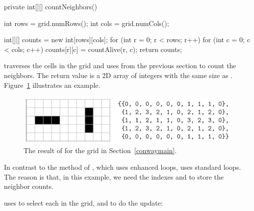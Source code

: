 \begin{code}
private int[][] countNeighbors() {
    int rows = grid.numRows();
    int cols = grid.numCols();

    int[][] counts = new int[rows][cols];
    for (int r = 0; r < rows; r++) {
        for (int c = 0; c < cols; c++) {
            counts[r][c] = countAlive(r, c);
        }
    }
    return counts;
}
\end{code}

 traverses the cells in the grid and uses  from the previous section to count the neighbors.
The return value is a 2D array of integers with the same size as .
Figure~\ref{fig:countNeigh} illustrates an example.

\begin{figure}[!ht]
\begin{center}
\includegraphics[trim=0 15 0 15,clip,width=0.93\linewidth]{figs/figure15-6.png}
\caption{The result of  for the grid in Section~\ref{conwaymain}.}
\label{fig:countNeigh}
\end{center}
\end{figure}

In contrast to the  method of , which uses enhanced  loops,  uses standard  loops.
The reason is that, in this example, we need the indexes  and  to store the neighbor counts.

 uses  to select each  in the grid, and  to do the update:


